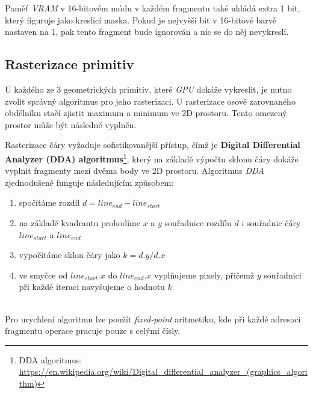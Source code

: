Paměť \textit{VRAM} v 16-bitovém módu v každém fragmentu také ukládá extra 1 bit, který figuruje jako kreslící maska. 
Pokud je nejvyšší bit v 16-bitové barvě nastaven na 1, pak tento fragment bude ignorován a nic se do něj nevykreslí.

\subsection{Rasterizace primitiv} \label{primitive-rasterization}

U každého ze 3 geometrických primitiv, které \textit{GPU} dokáže vykreslit, je nutno zvolit správný algoritmus pro jeho rasterizaci.
U rasterizace osově zarovnaného obdélníku stačí zjistit maximum a minimum ve 2D prostoru. Tento omezený prostor může být následně vyplněn.

Rasterizace čáry vyžaduje sofistikovanější přístup, čímž je \textbf{Digital Differential Analyzer (DDA) algoritmus}\footnote{DDA algoritmus: \newline \url{https://en.wikipedia.org/wiki/Digital_differential_analyzer_(graphics_algorithm)}}, 
který na základě výpočtu sklonu čáry dokáže vyplnit fragmenty mezi dvěma body ve 2D prostoru.
Algoritmus \textit{DDA} zjednodušeně funguje následujícím způsobem:\\[\baselineskip]
\begin{minipage}{\textwidth}
\begin{enumerate}
    \item{spočítáme rozdíl $d = line_{end} - line_{start}$}
    \item{na základě kvadrantu prohodíme $x$ a $y$ souřadnice rozdílu $d$ i souřadnic čáry $line_{start}$ a $line_{end}$}
    \item{vypočítáme sklon čáry jako $k = d.y / d.x$}
    \item{ve smyčce od $line_{start}.x$ do $line_{end}.x$ vyplňujeme pixely, přičemž $y$ souřadnici při každé iteraci navyšujeme o hodnotu $k$}
\end{enumerate}
\end{minipage}\\[\baselineskip]
Pro urychlení algoritmu lze použít \textit{fixed-point} aritmetiku, kde při každé adresaci fragmentu operace pracuje pouze s celými čísly.

